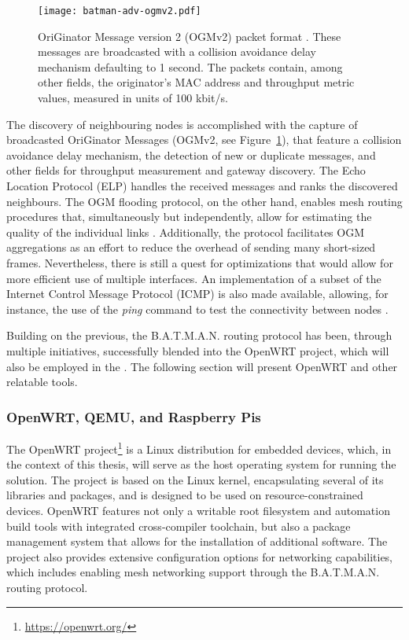 \begin{figure} [ht]
  \begin{center}
  \texttt{[image: batman-adv-ogmv2.pdf]}
  \caption{OriGinator Message version 2 (OGMv2) packet format \cite{cilfone2019wireless,open-mesh-ogmv2}. These messages are broadcasted with a collision avoidance delay mechanism defaulting to 1 second. The packets contain, among other fields, the originator's MAC address and throughput metric values, measured in units of 100 kbit/s.}
  \label{fig:batman-adv-ogmv2}
  \end{center}
\end{figure}

The discovery of neighbouring nodes is accomplished with the capture of broadcasted OriGinator Messages (OGMv2, see Figure~\ref{fig:batman-adv-ogmv2}), that feature a collision avoidance delay mechanism, the detection of new or duplicate messages, and other fields for throughput measurement and gateway discovery. The Echo Location Protocol (ELP) handles the received messages and ranks the discovered neighbours. The OGM flooding protocol, on the other hand, enables mesh routing procedures that, simultaneously but independently, allow for estimating the quality of the individual links \cite{cilfone2019wireless}. Additionally, the protocol facilitates OGM aggregations as an effort to reduce the overhead of sending many short-sized frames. Nevertheless, there is still a quest for optimizations that would allow for more efficient use of multiple interfaces. An implementation of a subset of the Internet Control Message Protocol (ICMP) is also made available, allowing, for instance, the use of the \emph{ping} command to test the connectivity between nodes \cite{seither2011routing}.

Building on the previous, the B.A.T.M.A.N. routing protocol has been, through multiple initiatives, successfully blended into the OpenWRT project, which will also be employed in the \poc. The following section will present OpenWRT and other relatable tools.

\subsubsection{OpenWRT, QEMU, and Raspberry Pis}

The OpenWRT project\footnote{\url{https://openwrt.org/}} is a Linux distribution for embedded devices, which, in the context of this thesis, will serve as the host operating system for running the \poc solution. The project is based on the Linux kernel, encapsulating several of its libraries and packages, and is designed to be used on resource-constrained devices. OpenWRT features not only a writable root filesystem and automation build tools with integrated cross-compiler toolchain, but also a package management system that allows for the installation of additional software. The project also provides extensive configuration options for networking capabilities, which includes enabling mesh networking support through the B.A.T.M.A.N. routing protocol. 

